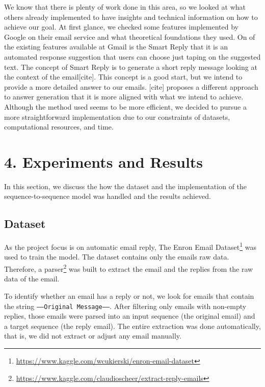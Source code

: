 \documentclass[letterpaper]{article}
\begin{document}
We know that there is plenty of work done in this area, so we looked at what others already implemented to have insights and technical information on how to achieve our goal. At first glance, we checked some features implemented by Google on their email service and what theoretical foundations they used. On of the existing features available at Gmail is the Smart Reply that it is an automated response suggestion that users can choose just taping on the suggested text. The concept of Smart Reply is to generate a short reply message looking at the context of the email[cite]. This concept is a good start, but we intend to provide a more detailed answer to our emails. [cite] proposes a different approach to answer generation that it is more aligned with what we intend to achieve. Although the method used seems to be more efficient, we decided to pursue a more straightforward implementation due to our constraints of datasets, computational resources, and time.


\section{4. Experiments and Results}

In this section, we discuss the how the dataset and the implementation of the sequence-to-sequence model was handled and the results achieved.

\subsection{Dataset}

As the project focus is on automatic email reply, The Enron Email Dataset\footnote{\href{https://www.kaggle.com/wcukierski/enron-email-dataset}{https://www.kaggle.com/wcukierski/enron-email-dataset}} was used to train the model. The dataset contains only the emails raw data. Therefore, a parser\footnote{\href{https://www.kaggle.com/claudioscheer/extract-reply-emails}{https://www.kaggle.com/claudioscheer/extract-reply-emails}} was built to extract the email and the replies from the raw data of the email.

To identify whether an email has a reply or not, we look for emails that contain the string \texttt{-----Original Message-----}. After filtering only emails with non-empty replies, those emails were parsed into an input sequence (the original email) and a target sequence (the reply email). The entire extraction was done automatically, that is, we did not extract or adjust any email manually.
\end{document}
